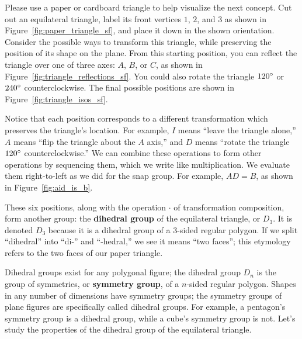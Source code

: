 \documentclass[../textbook.tex]{subfiles}
\begin{document}

\noindent Please use a paper or cardboard triangle to help visualize the next concept. Cut out an equilateral triangle, label its front vertices $1$, $2$, and $3$ as shown in Figure~\ref{fig:paper_triangle_sf}, and place it down in the shown orientation. Consider the possible ways to transform this triangle, while preserving the position of its shape on the plane. From this starting position, you can reflect the triangle over one of three axes: $A$, $B$, or $C$, as shown in Figure~\ref{fig:triangle_reflections_sf}. You could also rotate the triangle $120^\circ{}$ or $240^\circ{}$ counterclockwise. The final possible positions are shown in Figure~\ref{fig:triangle_isos_sf}.

Notice that each position corresponds to a different transformation which preserves the triangle's location. For example, $I$ means ``leave the triangle alone,'' $A$ means ``flip the triangle about the $A$ axis,'' and $D$ means ``rotate the triangle $120^\circ{}$ counterclockwise.'' We can combine these operations to form other operations by sequencing them, which we write like multiplication. We evaluate them right-to-left as we did for the snap group. For example, $AD=B$, as shown in Figure~\ref{fig:aid_is_b}.

These six positions, along with the operation $\cdot$ of transformation composition, form another group: the \textbf{dihedral group} of the equilateral triangle, or $D_3$. It is denoted $D_3$ because it is a dihedral group of a $3$-sided regular polygon. If we split ``dihedral'' into ``di-'' and ``-hedral,'' we see it means ``two faces''; this etymology refers to the two faces of our paper triangle.

Dihedral groups exist for any polygonal figure; the dihedral group $D_n$ is the group of symmetries, or \textbf{symmetry group}, of a $n$-sided regular polygon. Shapes in any number of dimensions have symmetry groups; the symmetry groups of plane figures are specifically called dihedral groups. For example, a pentagon's symmetry group is a dihedral group, while a cube's symmetry group is not. Let's study the properties of the dihedral group of the equilateral triangle.


\end{document}
